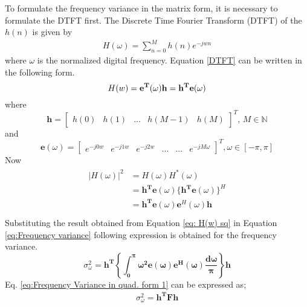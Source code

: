 To formulate the frequency variance in the matrix form, it is necessary to formulate the DTFT first. The Discrete Time Fourier Transform (DTFT) of the $h(n)$ is given by
\begin{eqnarray}
\label{DTFT}
H(\omega) = \sum_{n=0}^{M} h(n) e^{-jwn}
\end{eqnarray}
where $\omega$ is the normalized digital frequency. Equation \ref{DTFT} can be written in the following form.
\begin{equation}
H(w)=\mathbf{e^T}(\omega)\mathbf{h}  \\ = \mathbf{h^{T}e}(\omega)   
\end{equation}
where 
\begin{equation}
\label{eq:FilterVector}
\mathbf{h}=\left[\begin{array}{ccccc}
h(0) & h(1) & \ldots & h(M-1) & h(M)\end{array}\right]^{T},\, M\in\mathbb{N}
\end{equation}
and
\begin{equation}
\label{eq:Evector}
\mathbf{e}(\omega)=\left[\begin{array}{cccccc}
e^{-j0w} & e^{-j1w} & e^{-j2w} & \ldots & \ldots & e^{-jM\omega}\end{array}\right]^{T},\omega\in[-\pi,\pi]
\end{equation}
Now
\begin{eqnarray}
\label{eq: H(w) sq}
\begin{aligned}
|H(\omega)|^2 &= H(\omega)H^*(\omega)\\
&= \mathbf{h^{T}e}(\omega) \{ \mathbf{h^{T}e}(\omega) \}^{H}\\
&= \mathbf{h^{T}e}(\omega) \mathbf{e}^{H}(\omega) \mathbf{h}\\
\end{aligned}
\end{eqnarray}
Substituting the result obtained from Equation \ref{eq: H(w) sq} in Equation \ref{eq:Frequency variance} following expression is obtained for the frequency variance.
\begin{equation}
\label{eq:Frequency Variance in quad. form 1}
\sigma_{\omega}^{2}=\mathbf{h^{T}\left\{ \int_{0}^{\pi}\omega^{2}e(\omega)e^{H}(\omega)\frac{d\omega}{\pi}\right\} h}
\end{equation}
Eq. \ref{eq:Frequency Variance in quad. form 1} can be expressed as;
\begin{eqnarray}
\label{eq:Frequency Variance in quad. form 2}
\sigma_{\omega}^{2} = \mathbf{h^TFh}
\end{eqnarray}

